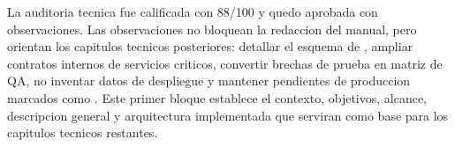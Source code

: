 La auditoria tecnica fue calificada con 88/100 y quedo aprobada con observaciones. Las observaciones no bloquean la redaccion del manual, pero orientan los capitulos tecnicos posteriores: detallar el esquema de , ampliar contratos internos de servicios criticos, convertir brechas de prueba en matriz de QA, no inventar datos de despliegue y mantener pendientes de produccion marcados como \MarcadorProduccionPendiente. Este primer bloque establece el contexto, objetivos, alcance, descripcion general y arquitectura implementada que serviran como base para los capitulos tecnicos restantes.
